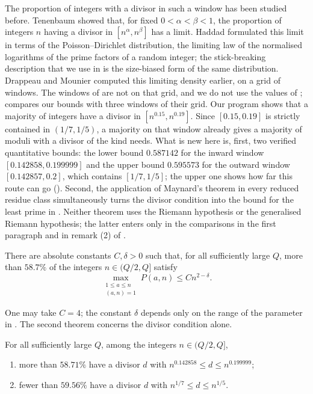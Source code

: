 \documentclass[11pt,colorlinks]{charlie}
\begin{document}
The proportion of integers with a divisor in such a window has been studied before. Tenenbaum \cite{Tenenbaum} showed that, for fixed $0<\alpha<\beta<1$, the proportion of integers $n$ having a divisor in $[n^\alpha,n^\beta]$ has a limit. Haddad \cite{Haddad} formulated this limit in terms of the Poisson--Dirichlet distribution, the limiting law of the normalised logarithms of the prime factors of a random integer; the stick-breaking description that we use in  is the size-biased form of the same distribution. Drappeau and Mounier \cite{DM} computed this limiting density earlier, on a grid of windows. The windows of  are not on that grid, and we do not use the values of \cite{DM};  compares our bounds with three windows of their grid. Our program shows that a majority of integers have a divisor in $[n^{0.15},n^{0.19}]$. Since $[0.15,0.19]$ is strictly contained in $(1/7,1/5)$, a majority on that window already gives a majority of moduli with a divisor of the kind  needs. What is new here is, first, two verified quantitative bounds: the lower bound $0.587142$ for the inward window $[0.142858,0.199999]$ and the upper bound $0.595573$ for the outward window $[0.142857,0.2]$, which contains $[1/7,1/5]$; the upper one shows how far this route can go (). Second, the application of Maynard's theorem in every reduced residue class simultaneously turns the divisor condition into the bound for the least prime in . Neither theorem uses the Riemann hypothesis or the generalised Riemann hypothesis; the latter \cite{Alpoge} enters only in the comparisons in the first paragraph and in remark (2) of .

\begin{theorem}\label{thm:main}
There are absolute constants $C,\delta>0$ such that, for all sufficiently large $Q$, more than $58.7\%$ of the integers $n\in(Q/2,Q]$ satisfy
\[
 \max_{\substack{1\le a\le n\\(a,n)=1}}P(a,n)\le Cn^{2-\delta}.
\]
\end{theorem}

One may take $C=4$; the constant $\delta$ depends only on the range of the parameter in . The second theorem concerns the divisor condition alone.

\begin{theorem}\label{thm:density}
For all sufficiently large $Q$, among the integers $n\in(Q/2,Q]$,
\begin{enumerate}
\item more than $58.71\%$ have a divisor $d$ with $n^{0.142858}\le d\le n^{0.199999}$;
\item fewer than $59.56\%$ have a divisor $d$ with $n^{1/7}\le d\le n^{1/5}$.
\end{enumerate}
\end{theorem}
\end{document}
